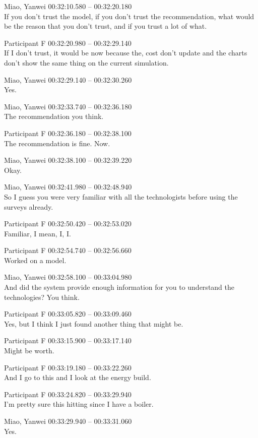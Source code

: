 {Miao, Yanwei 00:32:10.580 -- 00:32:20.180 \\
If you don't trust the model, if you don't trust the recommendation, what would be the reason that you don't trust, and if you trust a lot of what.

Participant F 00:32:20.980 -- 00:32:29.140 \\
If I don't trust, it would be now because the, cost don't update and the charts don't show the same thing on the current simulation.

Miao, Yanwei 00:32:29.140 -- 00:32:30.260 \\
Yes.

Miao, Yanwei 00:32:33.740 -- 00:32:36.180 \\
The recommendation you think.

Participant F 00:32:36.180 -- 00:32:38.100 \\
The recommendation is fine. Now.

Miao, Yanwei 00:32:38.100 -- 00:32:39.220 \\
Okay.

Miao, Yanwei 00:32:41.980 -- 00:32:48.940 \\
So I guess you were very familiar with all the technologists before using the surveys already.

Participant F 00:32:50.420 -- 00:32:53.020 \\
Familiar, I mean, I, I.

Participant F 00:32:54.740 -- 00:32:56.660 \\
Worked on a model.

Miao, Yanwei 00:32:58.100 -- 00:33:04.980 \\
And did the system provide enough information for you to understand the technologies? You think.

Participant F 00:33:05.820 -- 00:33:09.460 \\
Yes, but I think I just found another thing that might be.

Participant F 00:33:15.900 -- 00:33:17.140 \\
Might be worth.

Participant F 00:33:19.180 -- 00:33:22.260 \\
And I go to this and I look at the energy build.

Participant F 00:33:24.820 -- 00:33:29.940 \\
I'm pretty sure this hitting since I have a boiler.

Miao, Yanwei 00:33:29.940 -- 00:33:31.060 \\
Yes.

}
